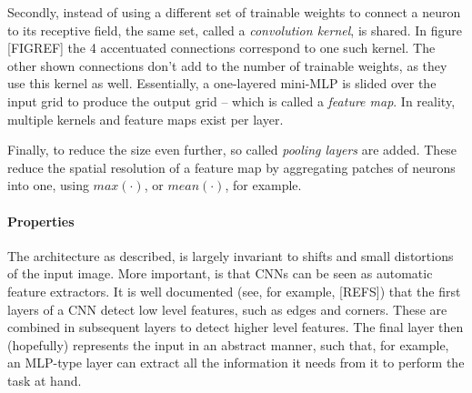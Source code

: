Secondly, instead of using a different set of trainable weights to connect a neuron to its receptive field, the same set, called a \textit{convolution kernel}, is shared. In figure [FIGREF] the 4 accentuated connections correspond to one such kernel. The other shown connections don't add to the number of trainable weights, as they use this kernel as well. Essentially, a one-layered mini-MLP is slided over the input grid to produce the output grid -- which is called a \textit{feature map}. In reality, multiple kernels and feature maps exist per layer.

Finally, to reduce the size even further, so called \textit{pooling layers} are added. These reduce the spatial resolution of a feature map by aggregating patches of neurons into one, using $max(\cdot)$, or $mean(\cdot)$, for example.

\paragraph{Properties}
The architecture as described, is largely invariant to shifts and small distortions of the input image. More important, is that CNNs can be seen as automatic feature extractors. It is well documented (see, for example, [REFS]) that the first layers of a CNN detect low level features, such as edges and corners. These are combined in subsequent layers to detect higher level features. The final layer then (hopefully) represents the input in an abstract manner, such that, for example, an MLP-type layer can extract all the information it needs from it to perform the task at hand.


